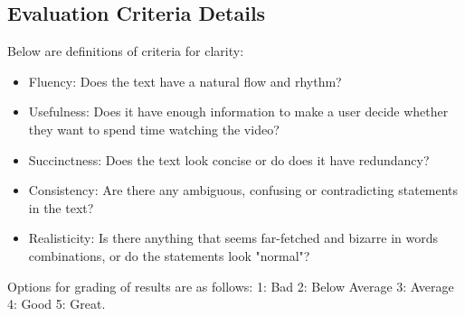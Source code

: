 \documentclass{article}
\begin{document}
\subsection{Evaluation Criteria Details}

Below are definitions of criteria for clarity:
\begin{itemize}

\item Fluency: Does the text have a natural flow and rhythm?
\item Usefulness: Does it have enough information to make a user decide whether they want to spend time watching the video?
\item Succinctness: Does the text look concise or do does it have redundancy?
\item Consistency: Are there any ambiguous, confusing or contradicting statements in the text?
\item Realisticity: Is there anything that seems far-fetched and bizarre in words combinations, or do the statements look "normal"?

\end{itemize}

Options for grading of results are as follows: 1: Bad   2: Below Average   3: Average   4: Good   5: Great.
\end{document}
